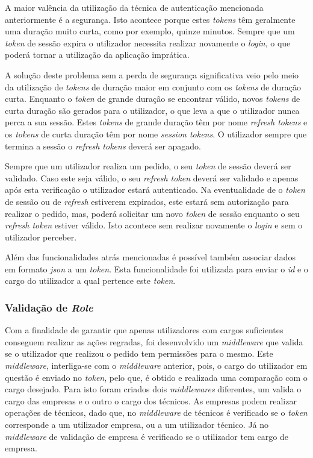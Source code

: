 A maior valência da utilização da técnica de autenticação mencionada anteriormente é a segurança. Isto acontece porque estes \textit{tokens} têm geralmente uma duração muito curta, como por exemplo, quinze minutos. Sempre que um \textit{token} de sessão expira o utilizador necessita realizar novamente o \textit{login}, o que poderá tornar a utilização da aplicação imprática.

A solução deste problema sem a perda de segurança significativa veio pelo meio da utilização de \textit{tokens} de duração maior em conjunto com os \textit{tokens} de duração curta. Enquanto o \textit{token} de grande duração se encontrar válido, novos \textit{tokens} de curta duração são gerados para o utilizador, o que leva a que o utilizador nunca perca a sua sessão. Estes \textit{tokens} de grande duração têm por nome \textit{refresh tokens} e os \textit{tokens} de curta duração têm por nome \textit{session tokens}. O utilizador sempre que termina a sessão o \textit{refresh tokens} deverá ser apagado.

Sempre que um utilizador realiza um pedido, o seu \textit{token} de sessão deverá ser validado. Caso este seja válido, o seu \textit{refresh token} deverá ser validado e apenas após esta verificação o utilizador estará autenticado. Na eventualidade de o \textit{token} de sessão ou de \textit{refresh} estiverem expirados, este estará sem autorização para realizar o pedido, mas, poderá solicitar um novo \textit{token} de sessão enquanto o seu \textit{refresh token} estiver válido. Isto acontece sem realizar novamente o \textit{login} e sem o utilizador perceber.

 Além das funcionalidades atrás mencionadas é possível também associar dados em formato \textit{\acrshort{json}} a um \textit{token}. Esta funcionalidade foi utilizada para enviar o \textit{id} e o cargo do utilizador a qual pertence este \textit{token}.

 \newpage

\subsubsection{Validação de \textit{Role}}

Com a finalidade de garantir que apenas utilizadores com cargos suficientes conseguem realizar as ações regradas, foi desenvolvido um \textit{middleware} que valida se o utilizador que realizou o pedido tem permissões para o mesmo. Este \textit{middleware}, interliga-se com o \textit{middleware} anterior, pois, o cargo do utilizador em questão é enviado no \textit{token}, pelo que, é obtido e realizada uma comparação com o cargo desejado. Para isto foram criados dois \textit{middlewares} diferentes, um valida o cargo das empresas e o outro o cargo dos técnicos. As empresas podem realizar operações de técnicos, dado que, no \textit{middleware} de técnicos é verificado se o \textit{token} corresponde a um utilizador empresa, ou a um utilizador técnico. Já no \textit{middleware} de validação de empresa é verificado se o utilizador tem cargo de empresa.
